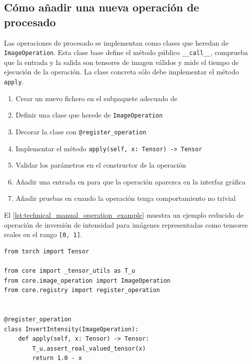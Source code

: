 \newpage

\subsection{Cómo añadir una nueva operación de procesado}

Las operaciones de procesado se implementan como clases que heredan de
\texttt{ImageOperation}. Esta clase base define el método público \texttt{\_\_call\_\_},
comprueba que la entrada y la salida son tensores de imagen válidos y mide el
tiempo de ejecución de la operación. La clase concreta sólo debe implementar el
método \texttt{apply}.


\begin{enumerate}[noitemsep]
    \item Crear un nuevo fichero en el subpaquete adecuado de 
    \item Definir una clase que herede de \texttt{ImageOperation}
    \item Decorar la clase con \texttt{@register\_operation}
    \item Implementar el método \texttt{apply(self, x: Tensor) -> Tensor}
    \item Validar los parámetros en el constructor de la operación
    \item Añadir una entrada en  para que la operación aparezca en la interfaz gráfica
    \item Añadir pruebas en  cuando la operación tenga comportamiento no trivial
\end{enumerate}

El \autoref{lst:technical_manual_operation_example} muestra un ejemplo reducido
de operación de inversión de intensidad para imágenes representadas como tensores
reales en el rango \texttt{[0, 1]}.

\begin{lstlisting}[style=pythonstyle, caption={Ejemplo simplificado de nueva operación de procesado}, label={lst:technical_manual_operation_example}]
from torch import Tensor

from core import _tensor_utils as T_u
from core.image_operation import ImageOperation
from core.registry import register_operation


@register_operation
class InvertIntensity(ImageOperation):
    def apply(self, x: Tensor) -> Tensor:
        T_u.assert_real_valued_tensor(x)
        return 1.0 - x
\end{lstlisting}


